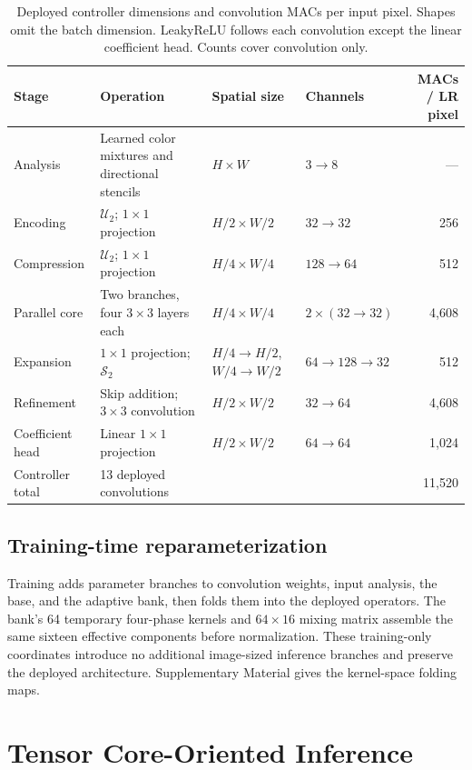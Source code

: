 \documentclass[10pt,twocolumn,letterpaper]{article}
\newcommand{\U}{\mathcal{U}}
\newcommand{\PS}{\mathcal{S}}
\begin{document}
\begin{table}[t]
\centering\small
\caption{Deployed controller dimensions and convolution MACs per input pixel. Shapes omit the batch dimension. LeakyReLU follows each convolution except the linear coefficient head. Counts cover convolution only.}
\label{tab:shapes}
\begin{tabular}{llllr}
\toprule
Stage & Operation & Spatial size & Channels & MACs / LR pixel\\
\midrule
Analysis & Learned color mixtures and directional stencils & $H\times W$ & $3\to8$ & ---\\
Encoding & $\U_2$; $1\times1$ projection & $H/2\times W/2$ & $32\to32$ & 256\\
Compression & $\U_2$; $1\times1$ projection & $H/4\times W/4$ & $128\to64$ & 512\\
Parallel core & Two branches, four $3\times3$ layers each & $H/4\times W/4$ & $2\times(32\to32)$ & 4,608\\
Expansion & $1\times1$ projection; $\PS_2$ & $H/4\to H/2$, $W/4\to W/2$ & $64\to128\to32$ & 512\\
Refinement & Skip addition; $3\times3$ convolution & $H/2\times W/2$ & $32\to64$ & 4,608\\
Coefficient head & Linear $1\times1$ projection & $H/2\times W/2$ & $64\to64$ & 1,024\\
\midrule
Controller total & 13 deployed convolutions & & & 11,520\\
\bottomrule
\end{tabular}
\end{table}

\subsection{Training-time reparameterization}
Training adds parameter branches to convolution weights, input analysis, the base, and the adaptive bank, then folds them into the deployed operators.
The bank's 64 temporary four-phase kernels and $64\times16$ mixing matrix assemble the same sixteen effective components before normalization.
These training-only coordinates introduce no additional image-sized inference branches and preserve the deployed architecture.
Supplementary Material gives the kernel-space folding maps.

\section{Tensor Core-Oriented Inference}
\label{sec:runtime}
\end{document}
